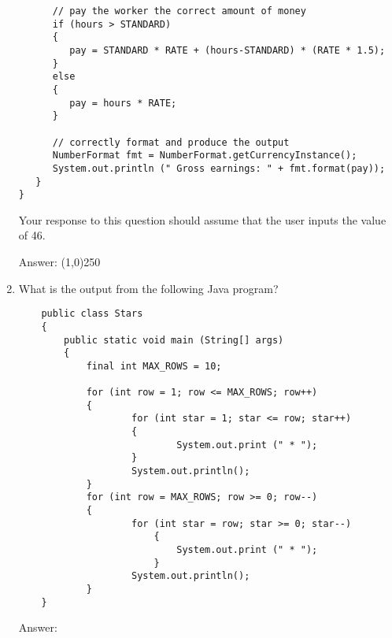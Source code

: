 \documentclass[12pt]{article}
\begin{document}
\begin{enumerate}
\begin{minipage}{6in}
\begin{lstlisting}
      // pay the worker the correct amount of money
      if (hours > STANDARD) 
      {
         pay = STANDARD * RATE + (hours-STANDARD) * (RATE * 1.5);
      }
      else 
      {
         pay = hours * RATE;
      }

      // correctly format and produce the output
      NumberFormat fmt = NumberFormat.getCurrencyInstance();
      System.out.println (" Gross earnings: " + fmt.format(pay));
   }
}
  \end{lstlisting}

\end{minipage}

Your response to this question should assume that the user inputs the value of 46.

Answer: \line(1,0){250}

\item What is the output from the following Java program?

\hspace*{.25in}
\begin{minipage}{6in}
  \lstset{numbers=left}
  \begin{lstlisting}
    public class Stars
    {
     	public static void main (String[] args)
        {
            final int MAX_ROWS = 10;

            for (int row = 1; row <= MAX_ROWS; row++)
            {
                    for (int star = 1; star <= row; star++)
                    {
                            System.out.print (" * ");
                    }
                    System.out.println();
            }
            for (int row = MAX_ROWS; row >= 0; row--)
            {
                    for (int star = row; star >= 0; star--)
                        {
                            System.out.print (" * ");
                        }
                    System.out.println();
            }
    }
  \end{lstlisting}

\end{minipage}

Answer: 


\end{enumerate}
\end{document}
